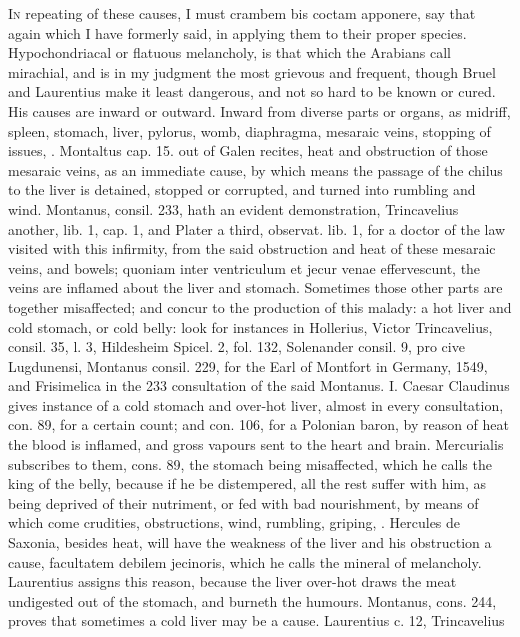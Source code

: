 {\lettrine{I}{n} repeating of these causes, I must crambem bis coctam apponere, say
that again which I have formerly said, in applying them to their proper
species. Hypochondriacal or flatuous melancholy, is that which the
Arabians call mirachial, and is in my judgment the most grievous and
frequent, though Bruel and Laurentius make it least dangerous, and not
so hard to be known or cured. His causes are inward or outward. Inward
from diverse parts or organs, as midriff, spleen, stomach, liver,
pylorus, womb, diaphragma, mesaraic veins, stopping of issues, \etc{}.
Montaltus cap. 15. out of Galen recites, heat and obstruction of
those mesaraic veins, as an immediate cause, by which means the passage
of the chilus to the liver is detained, stopped or corrupted, and
turned into rumbling and wind. Montanus, consil. 233, hath an evident
demonstration, Trincavelius another, lib. 1, cap. 1, and Plater a
third, observat. lib. 1, for a doctor of the law visited with this
infirmity, from the said obstruction and heat of these mesaraic veins,
and bowels; quoniam inter ventriculum et jecur venae effervescunt, the
veins are inflamed about the liver and stomach. Sometimes those other
parts are together misaffected; and concur to the production of this
malady: a hot liver and cold stomach, or cold belly: look for instances
in Hollerius, Victor Trincavelius, consil. 35, l. 3, Hildesheim Spicel.
2, fol. 132, Solenander consil. 9, pro cive Lugdunensi, Montanus
consil. 229, for the Earl of Montfort in Germany, 1549, and Frisimelica
in the 233 consultation of the said Montanus. I. Caesar Claudinus gives
instance of a cold stomach and over-hot liver, almost in every
consultation, con. 89, for a certain count; and con. 106, for a
Polonian baron, by reason of heat the blood is inflamed, and gross
vapours sent to the heart and brain. Mercurialis subscribes to them,
cons. 89, the stomach being misaffected, which he calls the king
of the belly, because if he be distempered, all the rest suffer with
him, as being deprived of their nutriment, or fed with bad nourishment,
by means of which come crudities, obstructions, wind, rumbling,
griping, \etc{}. Hercules de Saxonia, besides heat, will have the weakness
of the liver and his obstruction a cause, facultatem debilem jecinoris,
which he calls the mineral of melancholy. Laurentius assigns this
reason, because the liver over-hot draws the meat undigested out of the
stomach, and burneth the humours. Montanus, cons. 244, proves that
sometimes a cold liver may be a cause. Laurentius c. 12, Trincavelius
}
